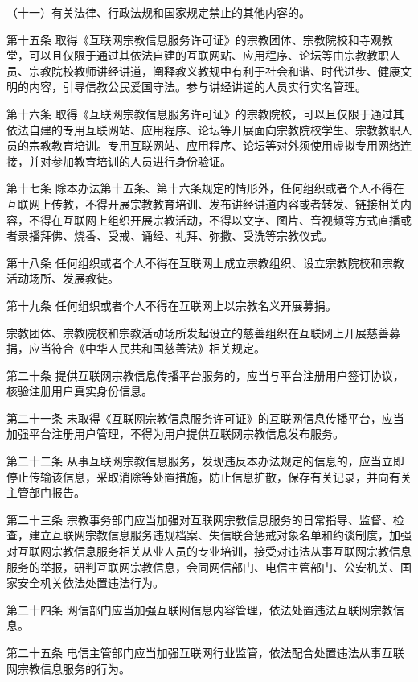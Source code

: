\documentclass[UTF8, 11pt, oneside]{ctexart}
\newcommand{\kongge}{\hspace{0.5em}}
\begin{document}
（十一）有关法律、行政法规和国家规定禁止的其他内容的。

第十五条 \kongge 取得《互联网宗教信息服务许可证》的宗教团体、宗教院校和寺观教堂，可以且仅限于通过其依法自建的互联网站、应用程序、论坛等由宗教教职人员、宗教院校教师讲经讲道，阐释教义教规中有利于社会和谐、时代进步、健康文明的内容，引导信教公民爱国守法。参与讲经讲道的人员实行实名管理。

第十六条 \kongge 取得《互联网宗教信息服务许可证》的宗教院校，可以且仅限于通过其依法自建的专用互联网站、应用程序、论坛等开展面向宗教院校学生、宗教教职人员的宗教教育培训。专用互联网站、应用程序、论坛等对外须使用虚拟专用网络连接，并对参加教育培训的人员进行身份验证。

第十七条 \kongge 除本办法第十五条、第十六条规定的情形外，任何组织或者个人不得在互联网上传教，不得开展宗教教育培训、发布讲经讲道内容或者转发、链接相关内容，不得在互联网上组织开展宗教活动，不得以文字、图片、音视频等方式直播或者录播拜佛、烧香、受戒、诵经、礼拜、弥撒、受洗等宗教仪式。

第十八条 \kongge 任何组织或者个人不得在互联网上成立宗教组织、设立宗教院校和宗教活动场所、发展教徒。

第十九条 \kongge 任何组织或者个人不得在互联网上以宗教名义开展募捐。

宗教团体、宗教院校和宗教活动场所发起设立的慈善组织在互联网上开展慈善募捐，应当符合《中华人民共和国慈善法》相关规定。

第二十条 \kongge 提供互联网宗教信息传播平台服务的，应当与平台注册用户签订协议，核验注册用户真实身份信息。

第二十一条 \kongge 未取得《互联网宗教信息服务许可证》的互联网信息传播平台，应当加强平台注册用户管理，不得为用户提供互联网宗教信息发布服务。

第二十二条 \kongge 从事互联网宗教信息服务，发现违反本办法规定的信息的，应当立即停止传输该信息，采取消除等处置措施，防止信息扩散，保存有关记录，并向有关主管部门报告。

第二十三条 \kongge 宗教事务部门应当加强对互联网宗教信息服务的日常指导、监督、检查，建立互联网宗教信息服务违规档案、失信联合惩戒对象名单和约谈制度，加强对互联网宗教信息服务相关从业人员的专业培训，接受对违法从事互联网宗教信息服务的举报，研判互联网宗教信息，会同网信部门、电信主管部门、公安机关、国家安全机关依法处置违法行为。

第二十四条 \kongge 网信部门应当加强互联网信息内容管理，依法处置违法互联网宗教信息。

第二十五条 \kongge 电信主管部门应当加强互联网行业监管，依法配合处置违法从事互联网宗教信息服务的行为。
\end{document}
